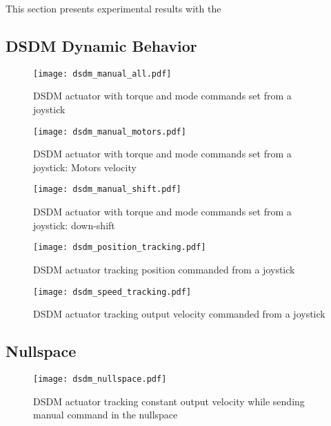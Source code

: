 This section presents experimental results with the 

\subsection{DSDM Dynamic Behavior}

\begin{figure}[H]
	\centering
		\texttt{[image: dsdm\_manual\_all.pdf]}
	\caption{DSDM actuator with torque and mode commands set from a joystick }
	\label{fig:dsdm_manual_all}
\end{figure}

\begin{figure}[H]
	\centering
		\texttt{[image: dsdm\_manual\_motors.pdf]}
	\caption{DSDM actuator with torque and mode commands set from a joystick: Motors velocity }
	\label{fig:dsdm_manual_motors}
\end{figure}

\begin{figure}[H]
	\centering
		\texttt{[image: dsdm\_manual\_shift.pdf]}
	\caption{DSDM actuator with torque and mode commands set from a joystick: down-shift }
	\label{fig:dsdm_manual_shift}
\end{figure}



\begin{figure}[H]
	\centering
		\texttt{[image: dsdm\_position\_tracking.pdf]}
	\caption{DSDM actuator tracking position commanded from a joystick }
	\label{fig:dsdm_position_tracking}
\end{figure}


\begin{figure}[H]
	\centering
		\texttt{[image: dsdm\_speed\_tracking.pdf]}
	\caption{DSDM actuator tracking output velocity commanded from a joystick }
	\label{fig:dsdm_speed_tracking}
\end{figure}


\subsection{Nullspace}

\begin{figure}[H]
	\centering
		\texttt{[image: dsdm\_nullspace.pdf]}
	\caption{DSDM actuator tracking constant output velocity while sending manual command in the nullspace }
	\label{fig:dsdm_nullspace}
\end{figure}


